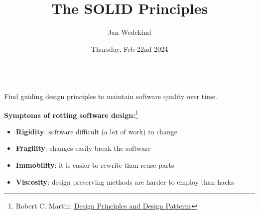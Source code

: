 \documentclass[calcdimensions,landscape,letterpaper]{powersem}
\title{The SOLID Principles}
\author{Jan Wedekind}
\date{Thursday, Feb 22nd 2024}
\newcommand{\thecurrentheading}{}
\newcommand{\heading}[1]{\renewcommand{\thecurrentheading}{#1}}
\begin{document}
\begin{slide}
  \heading{\ }
  \begin{center}
    \maketitle
  \end{center}
\end{slide}

\begin{slide}
  \heading{Motivation}
  \begin{center}
    \begin{minipage}[c]{.5\textwidth}
      \begin{center}
        \bigskip\\
        Find guiding design principles to maintain software quality over time.
      \end{center}
    \end{minipage}
  \end{center}
\end{slide}

\begin{slide}
  \heading{Software Rot}
  \begin{center}
    \textbf{Symptoms of rotting software design:}\footnote{Robert C. Martin: \href{https://staff.cs.utu.fi/~jounsmed/doos_06/material/DesignPrinciplesAndPatterns.pdf}{Design Principles and Design Patterns}}
    \begin{itemize}
      \item \textbf{Rigidity}: software difficult (a lot of work) to change
      \item \textbf{Fragility}: changes easily break the software
      \item \textbf{Immobility}: it is easier to rewrite than reuse parts
      \item \textbf{Viscosity}: design preserving methods are harder to employ than hacks
    \end{itemize}
  \end{center}
\end{slide}
\end{document}
